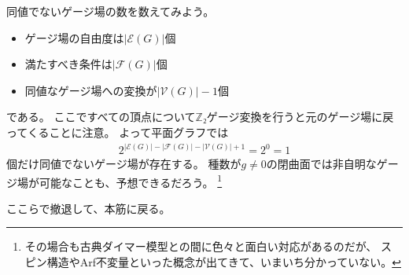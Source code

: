 \documentclass[\main/main.tex]{subfiles}
\begin{document}
\begin{frame}{\currentname}
    同値でないゲージ場の数を数えてみよう。
    \begin{itemize}
        \item ゲージ場の自由度は$|ℰ(G)|$個
        \item 満たすべき条件は$|ℱ(G)|$個
        \item 同値なゲージ場への変換が$|𝒱(G)|-1$個
    \end{itemize}
    である。
    ここですべての頂点について$ℤ₂$ゲージ変換を行うと元のゲージ場に戻ってくることに注意。
    よって平面グラフでは
    \begin{align}
        2^{|ℰ(G)| - |ℱ(G)| - |𝒱(G)| + 1} = 2^0 = 1
    \end{align}
    個だけ同値でないゲージ場が存在する。
    種数が$g ≠ 0$の閉曲面では非自明なゲージ場が可能なことも、予想できるだろう。
    \footnote{
        その場合も古典ダイマー模型との間に色々と面白い対応があるのだが、
        スピン構造やArf不変量といった概念が出てきて、いまいち分かっていない。
    }

    ここらで撤退して、本筋に戻る。
\end{frame}
\end{document}

